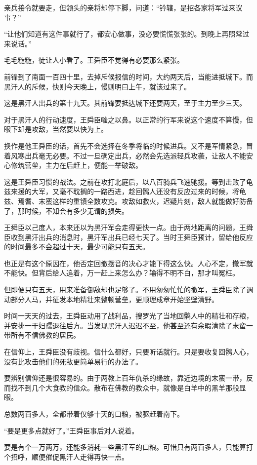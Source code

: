 亲兵接令就要走，但领头的亲将却停下脚，问道：“钤辖，是招各家将军过来议事？”

“让他们知道有这件事就行了，都安心做事，没必要慌慌张张的。到晚上再照常过来说话。”

毛毛糙糙，徒让人小看了。王舜臣不觉得有必要那么紧张。

前锋到了南面一百四十里，去掉斥候报信的时间，大约两天后，当能进抵城下。而黑汗人的斥候，快则今天晚上，慢则明曰上午，就该过来了。

这是黑汗人出兵的第十九天。其前锋要抵达城下还要两天，至于主力至少三天。

对于黑汗人的行动速度，王舜臣嗤之以鼻。以正常的行军来说这个速度不算慢，但眼下却是攻敌，当然要以快为上。

换作是他王舜臣的话，首先不会选择在冬季将临的时候进兵。又不是军情紧急，冒着风寒出兵毫无必要。不过一旦确定出兵，必然会先选派轻兵攻袭，让敌人不能安心修筑营垒，主力在后赶上，便能一举破敌。

这是王舜臣习惯的战法。之前在攻打北庭后，以八百骑兵飞速驰援。等到击败了龟兹来援的大军，又毫不耽搁的一路西进，趁回鹘人还没有反应过来的时候，将龟兹、焉耆、末蛮这样的重镇全数攻克。攻敌如救火，迟疑片刻，敌人就能做好防备了，那时候，不知会有多少无谓的损失。

王舜臣以己度人，本来还以为黑汗军会走得更快一点。由于两地距离的问题，王舜臣收到黑汗出兵的消息时，黑汗军出兵已经七天了。当时王舜臣预计，留给他反应的时间最多不会超过十天，最少可能只有五天。

也正是有这个原因在，他否定回撤摆音的决心才能下得这么快。人心不定，撤军就不能快。但背后给人追着，万一赶上来怎么办？输得不明不白，那才叫冤枉。

但即便只有五天，用来准备御敌却也足够了。不用匆匆忙忙的撤军，王舜臣除了调动部分人马，并征发本地精壮来整顿营垒，更顺理成章开始坚壁清野。

时间一天天的过去，王舜臣动用了战利品，搜罗光了当地回鹘人中的精壮和存粮，并安排一干妇孺退往后方。当发现黑汗人迟迟不至，他甚至还有余暇清除了末蛮一带所有不信佛教的居民。

在信仰上，王舜臣没有歧视。信什么都好，只要听话就行。只是要收复回鹘人心，没有比攻击他们的死敌更简单易行的办法了。

要辨别信仰还是很容易的。由于两教上百年仇杀的缘故，靠近边境的末蛮一带，反而找不到几个大食教的信众。散布在佛教的教众中，就像是白羊中的黑羊那般显眼。

总数两百多人，全都带着仅够十天的口粮，被驱赶着南下。

“要是更多点就好了。”王舜臣事后对人说着。

要是有个一万两万，还能多消耗一些黑汗军的口粮。可惜只有两百多人，只能算打个招呼，顺便催促黑汗人走得再快一点。


